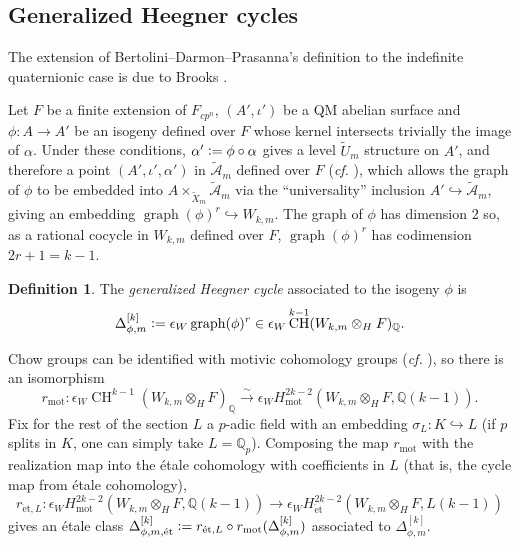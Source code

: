 \documentclass[a4paper]{amsart}
\numberwithin{equation}{section}
\theoremstyle{definition}
\newtheorem{definition}[theorem]{Definition}
\newcommand{\Q}{\mathbb{Q}}
\newcommand{\defeq}{\vcentcolon=}
\DeclareMathOperator{\CH}{CH}
\DeclareMathOperator{\et}{\text{\'et}}
\newcommand{\mot}{\mathrm{mot}}
\renewcommand{\et}{\mathrm{\acute{e}t}}
\begin{document}
\subsection{Generalized Heegner cycles}
The extension of Bertolini--Darmon--Prasanna's definition \cite[\S 2.3]{BertoliniDarmonPrasanna} to the indefinite quaternionic case is due to Brooks \cite[\S 6.2]{Brooks}.

Let $F$ be a finite extension of $F_{cp^n}$, $(A',\iota')$ be a QM abelian surface and $\phi\colon A\to A'$ be an isogeny defined over $F$ whose kernel intersects trivially the image of $\alpha$. Under these conditions, $\alpha'\defeq\phi\circ\alpha$ gives a level $\widetilde{U}_m$ structure on $A'$, and therefore a point $(A',\iota',\alpha')$ in $\widetilde{\mathcal{A}}_m$ defined over $F$ (\textit{cf.} \cite[Theorem 3.2]{Shimura.CCFZFAC}), which allows the graph of $\phi$ to be embedded into $A\times_{\widetilde{X}_m}\widetilde{\mathcal{A}}_m$ via the ``universality'' inclusion $A'\hookrightarrow\widetilde{\mathcal{A}}_m$, giving an embedding $\operatorname{graph}(\phi)^r\hookrightarrow W_{k,m}$. The graph of $\phi$ has dimension $2$ so, as a rational cocycle in $W_{k,m}$ defined over $F$, $\operatorname{graph}(\phi)^r$ has codimension $2r+1=k-1$.

\begin{definition}
The \emph{generalized Heegner cycle} associated to the isogeny $\phi$ is \[\Delta_{\phi,m}^{[k]}\defeq \epsilon_W\operatorname{graph}(\phi)^r\in\epsilon_W\CH^{k-1}(W_{k,m}\otimes_{H}F)_{\Q}.\]
\end{definition}

Chow groups can be identified with motivic cohomology groups (\textit{cf.} \cite[Corollary 19.2]{MazzaVoevodskyWeibel}), so there is an isomorphism
\begin{equation}
r_\mot\colon\epsilon_W\CH^{k-1}(W_{k,m}\otimes_{H}F)_{\Q}\stackrel{\sim}{\longrightarrow}\epsilon_W H^{2k-2}_{\mot}(W_{k,m}\otimes_{H}F,\Q(k-1)).
\end{equation}
Fix for the rest of the section $L$ a $p$-adic field with an embedding $\sigma_L\colon K\hookrightarrow L$ (if $p$ splits in $K$, one can simply take $L=\Q_p$). Composing the map $r_{\mathrm{mot}}$ with the realization map into the étale cohomology with coefficients in $L$ (that is, the cycle map from étale cohomology),
\begin{equation}
r_{{\et},L}\colon\epsilon_{W} H_\mathrm{mot}^{2k-2}(W_{k,m}\otimes_HF,\Q(k-1))\longrightarrow\epsilon_{W} H_{\et}^{2k-2}(W_{k,m}\otimes_HF,L(k-1))
\end{equation}
gives an étale class $\Delta_{\phi,m,\et}^{[k]}\defeq r_{\et,L}\circ r_{\mot}(\Delta_{\phi,m}^{[k]})$ associated to $\Delta_{\phi,m}^{[k]}$.
\end{document}
